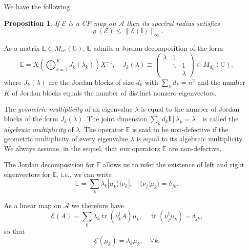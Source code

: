 \documentclass[prl,twocolumn,lengthcheck,superscriptaddress]{revtex4-1}
\newcommand{\tr}{\operatorname{tr}}
\newtheorem{proposition}{Proposition}
\theoremstyle{definition}
\theoremstyle{remark}
\begin{document}
We have the following
\begin{proposition}
	If $\mathcal{E}$ is a CP map on $\mathcal{A}$ then its spectral radius satisfies
	\begin{equation}
		\varrho(\mathcal{E}) \le \|\mathcal{E}(\mathbb{I})\|_{\infty}.
	\end{equation}
\end{proposition}

As a matrix $\mathbb{E} \in M_{n^2}(\mathbb{C})$, $\mathbb{E}$ admits a Jordan decomposition of the form
\begin{equation}
	\mathbb{E} = X\left(\bigoplus_{k=1}^K J_k(\lambda_k)\right)X^{-1}, \quad J_k(\lambda) \equiv \begin{pmatrix}\lambda & 1  & \\ & \ddots & 1 \\ && \lambda \end{pmatrix}\in M_{d_k}(\mathbb{C}),
\end{equation}
where $J_k(\lambda)$ are the Jordan blocks of size $d_k$ with $\sum_{k} d_k = n^2$ and the number $K$ of Jordan blocks equals the number of distinct nonzero eigenvectors.

The \emph{geometric multiplicity} of an eigenvalue $\lambda$ is equal to the number of Jordan blocks of the form $J_k(\lambda)$. The joint dimension $\sum_{k} d_k \mathbf{I}[\lambda_k = \lambda] $ is called the \emph{algebraic multiplicity} of $\lambda$. The operator $\mathbb{E}$ is said to be non-defective if the geometric multiplicity of every eigenvalue $\lambda$ is equal to its algebraic multiplicity. We always assume, in the sequel, that our operators $\mathbb{E}$ are non-defective. 

The Jordan decomposition for $\mathbb{E}$ allows us to infer the existence of left and right eigenvectors for $\mathbb{E}$, i.e., we can write
\begin{equation}
	\mathbb{E} = \sum_{k} \lambda_k |\mu_k\rangle \langle \nu_k|, \quad \langle \nu_j|\mu_k\rangle = \delta_{jk}.
\end{equation}

As a linear map on $\mathcal{A}$ we therefore have
\begin{equation}
	\mathcal{E}(A) = \sum_{k} \lambda_k \tr(\nu_k^\dag A)\mu_k, \quad \tr(\nu_j^\dag \mu_k) = \delta_{jk},
\end{equation}
so that
\begin{equation}
	\mathcal{E}(\mu_k) = \lambda_k \mu_k, \quad \forall k.
\end{equation}
\end{document}
